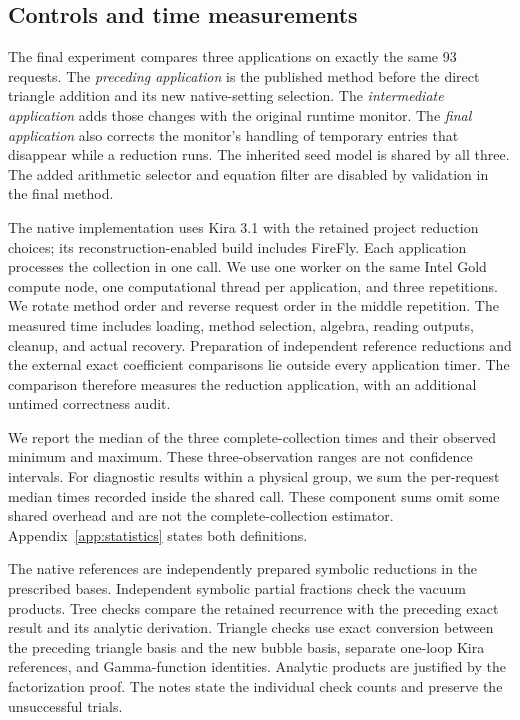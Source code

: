 \subsection{Controls and time measurements}
The final experiment compares three applications on exactly the same 93 requests. The \emph{preceding application} is the published method before the direct triangle addition and its new native-setting selection. The \emph{intermediate application} adds those changes with the original runtime monitor. The \emph{final application} also corrects the monitor's handling of temporary entries that disappear while a reduction runs. The inherited seed model is shared by all three. The added arithmetic selector and equation filter are disabled by validation in the final method.

The native implementation uses Kira 3.1 with the retained project reduction choices; its reconstruction-enabled build includes FireFly. Each application processes the collection in one call. We use one worker on the same Intel Gold compute node, one computational thread per application, and three repetitions. We rotate method order and reverse request order in the middle repetition. The measured time includes loading, method selection, algebra, reading outputs, cleanup, and actual recovery. Preparation of independent reference reductions and the external exact coefficient comparisons lie outside every application timer. The comparison therefore measures the reduction application, with an additional untimed correctness audit.

We report the median of the three complete-collection times and their observed minimum and maximum. These three-observation ranges are not confidence intervals. For diagnostic results within a physical group, we sum the per-request median times recorded inside the shared call. These component sums omit some shared overhead and are not the complete-collection estimator. Appendix~\ref{app:statistics} states both definitions.

The native references are independently prepared symbolic reductions in the prescribed bases. Independent symbolic partial fractions check the vacuum products. Tree checks compare the retained recurrence with the preceding exact result and its analytic derivation. Triangle checks use exact conversion between the preceding triangle basis and the new bubble basis, separate one-loop Kira references, and Gamma-function identities. Analytic products are justified by the factorization proof. The notes state the individual check counts and preserve the unsuccessful trials.

